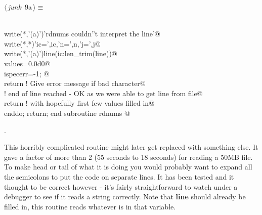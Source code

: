 \documentclass[10pt,a4paper,notitlepage]{article}
\newcommand{\var}[1]{\textbf{\textsf{#1}}} %
\begin{document}
\begin{flushleft}
\begin{minipage}{\linewidth}
\begin{list}{}{\setlength{\itemsep}{-\parsep}\setlength{\itemindent}{-\leftmargin}}
\item{}
\end{list}
\end{minipage}\vspace{4ex}
\end{flushleft}
\begin{flushleft} \small
\begin{minipage}{\linewidth}\label{scrap8}\raggedright\small
{} $\langle\,${\it junk}\nobreak\ {\footnotesize {9a}}$\,\rangle\equiv$
\vspace{-1ex}
\begin{list}{}{} \item
\mbox{}\verb@@\\
\mbox{}      write(*,'(a)')'rdnums couldn''t interpret the line'@\\
\mbox{}\verb@        write(*,*)'ic=',ic,'n=',n,'j=',j@\\
\mbox{}\verb@        write(*,'(a)')line(ic:len_trim(line))@\\
\mbox{}\verb@        values=0.0d0@\\
\mbox{}\verb@        ispecerr=-1; @\\
\mbox{}\verb@        return ! Give error message if bad character@\\
\mbox{}\verb@! end of line reached - OK as we were able to get line from file@\\
\mbox{}      return ! with hopefully first few values filled in@\\
\mbox{}\verb@      enddo; return; end subroutine rdnums                                   @{\NWsep}
\end{list}
\vspace{-1.5ex}
\footnotesize
\begin{list}{}{\setlength{\itemsep}{-\parsep}\setlength{\itemindent}{-\leftmargin}}
\item {\NWtxtMacroNoRef}.

\item{}
\end{list}
\end{minipage}\vspace{4ex}
\end{flushleft}
This horribly complicated routine might later get replaced with something 
else. It gave a factor of more than 2 (55 seconds to 18 seconds) for 
reading a 50MB file. 
To make head or tail of what it is doing you would probably want to expand
all the semicolons to put the code on separate lines. 
It has been tested and it thought to be correct however - it's fairly 
straightforward to watch under a debugger to see if it reads a string
correctly. Note that \var{line} should already be filled in, this routine
reads whatever is in that variable.
\end{document}
